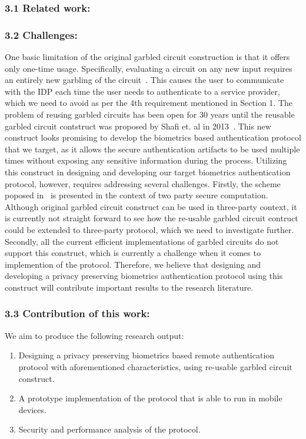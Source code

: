 \documentclass[10pt]{article}
\begin{document}
\subsubsection*{3.1 Related work:}

\subsubsection*{3.2 Challenges:}
One basic limitation of the original garbled circuit construction is that it offers only one-time usage. Specifically, evaluating a circuit on any 
new input requires an entirely new garbling of the circuit~\cite{reusablegc}. This causes the user to communicate with the IDP each time the user 
needs to authenticate to a service provider, which we need to avoid as per the 4th requirement mentioned in Section 1. The problem of reusing garbled 
circuits has been open for 30 years until the reusable garbled circuit contstruct was proposed by Shafi et. al in 2013~\cite{reusablegc}. This new 
construct looks promising to develop the biometrics based authentication protocol that we target, as it allows the secure authentication artifacts to 
be used multiple times without exposing any sensitive information during the process.
Utilizing this construct in designing and developing our target biometrics authentication protocol, however, requires addressing several challenges. 
Firstly, the scheme poposed in~\cite{reusablegc} is presented in the context of two party secure computation. Although original garbled circuit 
construct can be used in three-party context, it is currently not straight forward to see how the re-usable garbled circuit contruct could be extended 
to three-party protocol, which we need to investigate further. Secondly, all the current efficient implementations of garbled circuits do not support 
this construct, which is currently a challenge when it comes to implemention of the protocol. Therefore, we believe that designing and developing a 
privacy preserving biometrics authentication protocol using this construct will contribute important results to the research literature.

\subsubsection*{3.3 Contribution of this work:}
We aim to produce the following research output:
\begin{enumerate}
 \item Designing a privacy preserving biometrics based remote authentication protocol with aforementioned characteristics, using re-usable garbled 
circuit construct. 
 \item A prototype implementation of the protocol that is able to run in mobile devices.
 \item Security and performance analysis of the protocol.
\end{enumerate}
\end{document}
